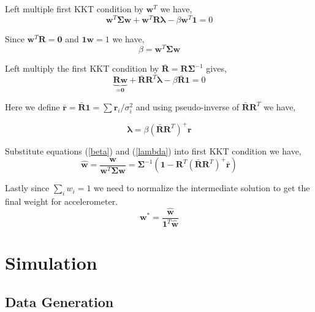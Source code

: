 \documentclass[conference]{IEEEtran}
\begin{document}
Left multiple first KKT condition by $\textbf{w}^T$ we have,
\begin{equation}
\textbf{w}^T\bm{\Sigma}\textbf{w} + \textbf{w}^T\textbf{R}\bm{\lambda} - \beta \textbf{w}^T\textbf{1} = 0
\end{equation}

Since $\textbf{w}^T\textbf{R} = \textbf{0}$ and $\textbf{1}\textbf{w} = 1$ we have,
\begin{equation}\label{beta}
    \beta = \textbf{w}^T\bm{\Sigma}\textbf{w}
\end{equation}

Left multiply the first KKT condition by $\bar{\textbf{R}} = \textbf{R}\bm{\Sigma}^{-1}$ gives,
\begin{equation}
\underbrace{\textbf{R}\textbf{w}}_{=\textbf{0}} + \bar{\textbf{R}}\textbf{R}^T\bm{\lambda} - \beta\bar{\textbf{R}}\textbf{1} = 0
\end{equation}

Here we define $\bar{\textbf{r}} = \bar{\textbf{R}}\textbf{1} = \sum{\textbf{r}_i / \sigma_i^2}$ and using pseudo-inverse of $\bar{\textbf{R}}\textbf{R}^T$ we have,

\begin{equation}\label{lambda}
    \bm{\lambda} = \beta \left(\bar{\textbf{R}}\textbf{R}^T\right)^{+} \textbf{r}
\end{equation}

Substitute equations (\ref{beta}) and (\ref{lambda}) into first KKT condition we have,
\begin{equation}
    \hat{\textbf{w}} = \frac{\textbf{w}}{\textbf{w}^T\bm{\Sigma}\textbf{w}} = \bm{\Sigma}^{-1} \left( \textbf{1} - \textbf{R}^T \left(\bar{\textbf{R}}\textbf{R}^T\right)^{+} \bar{\textbf{r}} \right)
\end{equation}

Lastly since $\sum_i{w_i} = 1$ we need to normalize the intermediate solution to get the final weight for accelerometer.
\begin{equation}
    \textbf{w}^* = \frac{\hat{\textbf{w}}}{\textbf{1}^T \hat{\textbf{w}}}
\end{equation}

\section{Simulation}

\subsection{Data Generation}
\end{document}
